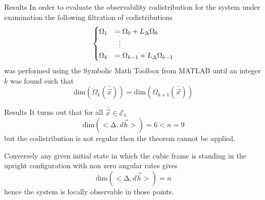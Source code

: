 \begin{frame}{Results}
In order to evaluate the observability codistribution for the system under examination
 the following filtration of codistributions
\[
\begin{cases}
\Omega_1 &= \Omega_0 + L_\Delta \Omega_0\\
&\vdotswithin{=} \\
\Omega_k &= \Omega_{k-1} + L_\Delta \Omega_{k-1}
\end{cases}
\]
was performed using the Symbolic Math Toolbox from MATLAB until an integer $k$ was found such that
\[
\mathrm{dim}(\Omega_{k}(\bar{\vec{x}})) = \mathrm{dim}(\Omega_{k + 1}(\bar{\vec{x}}))
\]
\end{frame}

\begin{frame}{Results}
It turns out that for all $\bar{\vec{x}} \in \mathcal{E}_{1}$
\[
\mathrm{dim} (<\mathrm{\Delta},d\vec{h}>) = 6 < n = 9
\]
but the codistribution is \alert{not} regular then the theorem cannot be applied.

Conversely any given initial state in which the cubic frame is standing in the upright
configuration with \alert{non zero angular rates} gives
\[
\mathrm{dim} (<\mathrm{\Delta},d\vec{h}>) = n
\]
hence the system \alert{is locally observable} in those points.    
\end{frame}
